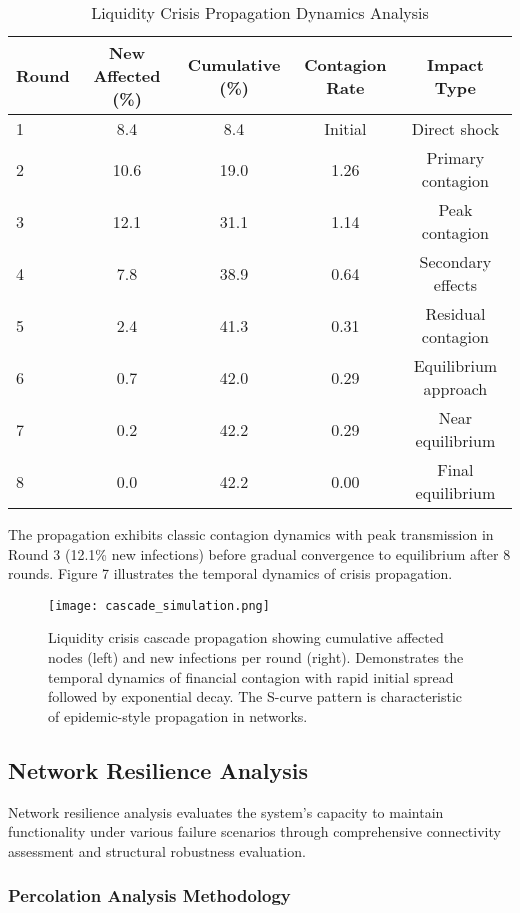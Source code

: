 \documentclass[a4 paper, 11pt,twoside]{article}
\newcommand{\0}{\Bf{0}}
\theoremstyle{definition}
\begin{document}
\begin{table}[H]
\centering
\caption{Liquidity Crisis Propagation Dynamics Analysis}
\begin{tabular}{@{}lcccc@{}}
\toprule
\textbf{Round} & \textbf{New Affected (\%)} & \textbf{Cumulative (\%)} & \textbf{Contagion Rate} & \textbf{Impact Type} \\
\midrule
1 & 8.4 & 8.4 & Initial & Direct shock \\
2 & 10.6 & 19.0 & 1.26 & Primary contagion \\
3 & 12.1 & 31.1 & 1.14 & Peak contagion \\
4 & 7.8 & 38.9 & 0.64 & Secondary effects \\
5 & 2.4 & 41.3 & 0.31 & Residual contagion \\
6 & 0.7 & 42.0 & 0.29 & Equilibrium approach \\
7 & 0.2 & 42.2 & 0.29 & Near equilibrium \\
8 & 0.0 & 42.2 & 0.00 & Final equilibrium \\
\bottomrule
\end{tabular}
\end{table}

The propagation exhibits classic contagion dynamics with peak transmission in Round 3 (12.1\% new infections) before gradual convergence to equilibrium after 8 rounds. Figure 7 illustrates the temporal dynamics of crisis propagation.

\begin{figure}[H]
\centering
\texttt{[image: cascade\_simulation.png]}
\caption{Liquidity crisis cascade propagation showing cumulative affected nodes (left) and new infections per round (right). Demonstrates the temporal dynamics of financial contagion with rapid initial spread followed by exponential decay. The S-curve pattern is characteristic of epidemic-style propagation in networks.}
\end{figure}

\subsection{Network Resilience Analysis}

Network resilience analysis evaluates the system's capacity to maintain functionality under various failure scenarios through comprehensive connectivity assessment and structural robustness evaluation.

\subsubsection{Percolation Analysis Methodology}
\end{document}
